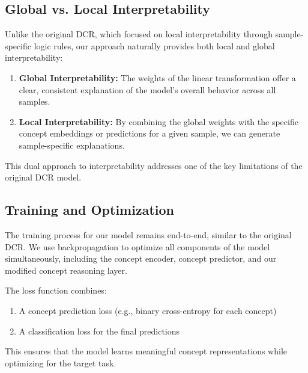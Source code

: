 \documentclass[sigconf, nonacm]{acmart}
\begin{document}
\subsection{Global vs. Local Interpretability}
\vspace{2pt}
Unlike the original DCR, which focused on local interpretability through sample-specific logic rules, our approach naturally provides both local and global interpretability: \vspace{4pt}

\begin{enumerate}
    \item \textbf{Global Interpretability:} The weights of the linear transformation offer a clear, consistent explanation of the model's overall behavior across all samples. \vspace{8pt}
    \item \textbf{Local Interpretability:} By combining the global weights with the specific concept embeddings or predictions for a given sample, we can generate sample-specific explanations.
\end{enumerate}

This dual approach to interpretability addresses one of the key limitations of the original DCR model. \vspace{6pt}

\subsection{Training and Optimization}
\vspace{2pt}
The training process for our model remains end-to-end, similar to the original DCR. We use backpropagation to optimize all components of the model simultaneously, including the concept encoder, concept predictor, and our modified concept reasoning layer.

The loss function combines: \vspace{4pt}
\begin{enumerate}
    \item A concept prediction loss (e.g., binary cross-entropy for each concept) \vspace{8pt}
    \item A classification loss for the final predictions \vspace{8pt}
\end{enumerate}

This ensures that the model learns meaningful concept representations while optimizing for the target task. \vspace{6pt}
\end{document}
